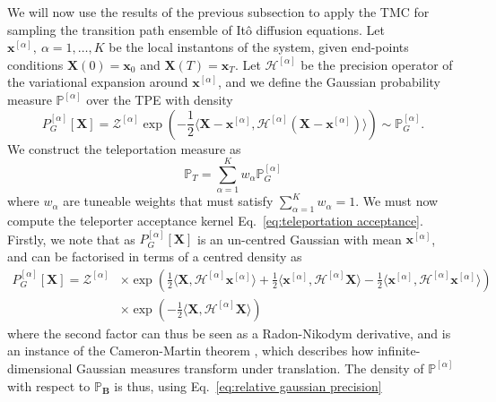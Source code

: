 We will now use the results of the previous subsection to apply the TMC for sampling the transition path ensemble of It\^{o} diffusion equations. Let $\mathbf{x}^{[\alpha]},\ \alpha=1,\dots,K$ be the local instantons of the system, given end-points conditions $\mathbf{X}(0) = \mathbf{x}_0$ and $\mathbf{X}(T) = \mathbf{x}_T$. Let $\mathcal{H}^{[\alpha]}$ be the precision operator of the variational expansion around $\mathbf{x}^{[\alpha]}$, and we define the Gaussian probability measure $\mathbb{P}^{[\alpha]}$ over the TPE with density
\begin{equation} \label{eq:Gaussian expansion around instanton}
	P_G^{[\alpha]}[\mathbf{X}] = \mathcal{Z}^{[\alpha]} \exp\left( -\frac{1}{2} \langle \mathbf{X} - \mathbf{x}^{[\alpha]}, \mathcal{H}^{[\alpha]} (\mathbf{X} - \mathbf{x}^{[\alpha]}) \rangle  \right) \sim \mathbb{P}^{[\alpha]}_G.
\end{equation}
We construct the teleportation measure as
\begin{equation} \label{eq:TMC path-space teleportation measure}
	\mathbb{P}_T = \sum_{\alpha=1}^K w_\alpha \mathbb{P}^{[\alpha]}_G
\end{equation}
where $w_\alpha$ are tuneable weights that must satisfy $\sum_{\alpha=1}^{K}w_{\alpha}=1$. We must now compute the teleporter acceptance kernel Eq.~\ref{eq:teleportation acceptance}. Firstly, we note that as $P_G^{[\alpha]}[\mathbf{X}]$ is an un-centred Gaussian with mean $\mathbf{x}^{[\alpha]}$, and can be factorised in terms of a centred density as
\begin{equation}
\begin{aligned}
	P_G^{[\alpha]}[\mathbf{X}]  = \mathcal{Z}^{[\alpha]}
		& \times \exp \left( \frac{1}{2} \langle \mathbf{X}, \mathcal{H}^{[\alpha]} \mathbf{x}^{[\alpha]} \rangle + \frac{1}{2} \langle \mathbf{x}^{[\alpha]}, \mathcal{H}^{[\alpha]} \mathbf{X} \rangle - \frac{1}{2} \langle \mathbf{x}^{[\alpha]}, \mathcal{H}^{[\alpha]} \mathbf{x}^{[\alpha]} \rangle  \right) \\
		& \times \exp \left( -\frac{1}{2} \langle \mathbf{X}, \mathcal{H}^{[\alpha]} \mathbf{X} \rangle \right)
\end{aligned}
\end{equation} 
where the second factor can thus be seen as a Radon-Nikodym derivative, and is an instance of the Cameron-Martin theorem \citep{cameronTransformationsWeinerIntegrals1944b}, which describes how infinite-dimensional Gaussian measures transform under translation. The density of $\mathbb{P}^{[\alpha]}$ with respect to $\mathbb{P}_\mathbf{B}$ is thus, using Eq.~\ref{eq:relative gaussian precision}
